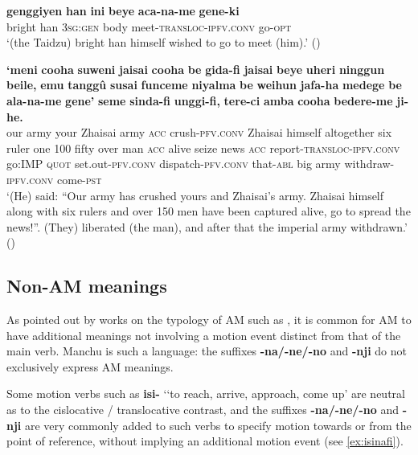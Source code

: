 \documentclass{article}
\newcommand{\ipa}[1]{\textbf{{\phon\mbox{#1}}}} %
\begin{document}
\begin{exe}
\ex \label{ex:acaname.geneki}
\gll
\ipa{genggiyen} 	\ipa{han} 	\ipa{ini} 	\ipa{beye} 	\ipa{aca-na-me} 	\ipa{gene-ki} \\
bright han \textsc{3sg:gen} body meet-\textsc{transloc-ipfv.conv} go-\textsc{opt} \\
\glt ‘(the Taidzu) bright han himself wished to go to meet (him).’ (\citealt[243, 121]{shunjuu92yargiyan})
\end{exe}

\begin{exe}
\ex \label{ex:alaname.gene}
\gll
\ipa{`meni} 	\ipa{cooha} 	\ipa{suweni} 	\ipa{jaisai} 	\ipa{cooha} 	\ipa{be} 	\ipa{gida-fi} 	\ipa{jaisai} 	\ipa{beye} 	\ipa{uheri} 	\ipa{ninggun} 	\ipa{beile,} 	\ipa{emu} 	\ipa{tanggû} 	\ipa{susai} 	\ipa{funceme} 	\ipa{niyalma} 	\ipa{be} 	\ipa{weihun} 	\ipa{jafa-ha} 	\ipa{medege} 	\ipa{be} 	\ipa{ala-na-me} 	\ipa{gene'} 	\ipa{seme} 	\ipa{sinda-fi} 	\ipa{unggi-fi,} 	\ipa{tere-ci} 	\ipa{amba} 	\ipa{cooha} 	\ipa{bedere-me} 	\ipa{ji-he.} \\
our army your Zhaisai army \textsc{acc} crush-\textsc{pfv.conv} Zhaisai himself altogether six ruler one 100 fifty over man \textsc{acc} alive seize news \textsc{acc} report-\textsc{transloc-ipfv.conv} go:\textsc{IMP} \textsc{quot} set.out-\textsc{pfv.conv} dispatch-\textsc{pfv.conv} that-\textsc{abl} big army withdraw-\textsc{ipfv.conv} come-\textsc{pst} \\
\glt ‘(He) said: “Our army has crushed yours and Zhaisai’s army. Zhaisai himself along with six rulers and over 150 men have been captured alive, go to spread the news!”. (They) liberated (the man), and after that the imperial army withdrawn.’ (\citealt[227, 20-21]{shunjuu92yargiyan})
\end{exe}

\subsection{Non-AM meanings}
As pointed out by works on the typology of AM such as \citet[3]{guillaume16am}, it is common for AM to have additional meanings not involving a motion event distinct from that of the main verb. Manchu is such a language: the suffixes \ipa{-na/-ne/-no} and \ipa{-nji} do not exclusively express AM meanings. 

Some motion verbs such as \ipa{isi-} `‘to reach, arrive, approach, come up' are neutral as to the cislocative / translocative contrast, and the suffixes \ipa{-na/-ne/-no} and \ipa{-nji} are very commonly added to such verbs to specify motion towards or from the point of reference, without implying an additional motion event (see \ref{ex:isinafi}).
\end{document}
